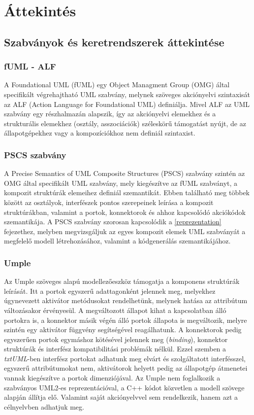 \documentclass[a4paper,12pt]{report}
\begin{document}
\chapter{Áttekintés}

\section{Szabványok és keretrendszerek áttekintése}
\subsection{fUML - ALF}
A Foundational UML (fUML) \cite{fmul} egy Object Managment Group (OMG) által specifikált végrehajtható UML szabvány, 
melynek szöveges akciónyelvi szintaxisát az ALF (Action Language for Foundational UML) \cite{alf} definiálja.
Mivel ALF az UML szabvány egy részhalmazán alapszik, így az akciónyelvi elemekhez és a strukturális elemekhez (osztály, asszociációk)  széleskörű támogatást nyújt, de az állapotgépekhez vagy a kompozíciókhoz nem definiál szintaxist.

\subsection{PSCS szabvány}
A  Precise Semantics of UML Composite Structures (PSCS)  szabvány \cite{pscs} szintén az OMG által specifikált UML szabvány, mely kiegészítve az fUML szabványt, a kompozit struktúrák elemeihez definiál szemantikát. Ebben található meg többek között az osztályok, interfészek pontos szerepeinek leírása a kompozit struktúrákban, valamint a portok, konnektorok és ahhoz kapcsolódó akciókódok szemantikája. A PSCS szabvány szorosan kapcsolódik a \ref{reprezentation} fejezethez, melyben megvizsgáljuk az egyes kompozit elemek UML szabványát a megfelelő modell létrehozásához, valamint a kódgenerálás szemantikájához.

\subsection{Umple}
Az Umple \cite{umple} szöveges alapú modellezőeszköz támogatja a komponens struktúrák leírását. Itt a portok egyszerű adattagonként jelennek meg, melyekhez úgynevezett aktivátor metódusokat rendelhetünk, melynek hatása az attribútum változásakor érvényesül. A megváltozott állapot kihat a kapcsolatban álló portokra is, a konnektor másik végén álló portok állapota is megváltozik, melyre szintén egy aktivátor függvény segítségével reagálhatunk. A konnektorok pedig egyszerűen portok egymáshoz kötésével jelennek meg (\textit{binding}), konnektor struktúrák és interfész kompatibilitási problémák nélkül. Ezzel szemben a \textit{txtUML}-ben interfész portokat adhatunk meg elvárt és szolgáltatott interfésszel, egyszerű attribútumokat nem, aktivátorok helyett pedig az állapotgép átmenetei vannak kiegészítve a portok dimenziójával. Az Umple nem foglalkozik a szabványos UML2-es reprezentációval, a C++ kódot közvetlen a modell szövege alapján állítja elő. Valamint saját akciónyelvvel sem rendelkezik, hanem azt a célnyelvben adhatjuk meg. \\
\end{document}

